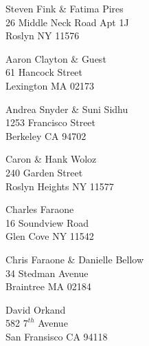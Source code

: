 \documentclass{article}
\begin{document}
\begin{center}
\begin{Huge}
\clearpage

\vspace*{\fill}
Steven Fink \& Fatima Pires\\
26 Middle Neck Road Apt 1J\\
Roslyn NY 11576\\
\vspace{\fill}

\clearpage

\vspace*{\fill}
Aaron Clayton \& Guest\\
61 Hancock Street\\
Lexington MA 02173\\
\vspace{\fill}

\clearpage

\vspace*{\fill}
Andrea Snyder \& Suni Sidhu\\
1253 Francisco Street\\
Berkeley CA 94702\\
\vspace{\fill}

\clearpage

\vspace*{\fill}
Caron \& Hank Woloz\\
240  Garden Street\\
Roslyn Heights NY 11577\\
\vspace{\fill}

\clearpage

\vspace*{\fill}
Charles Faraone\\
16 Soundview Road\\
Glen Cove NY 11542\\
\vspace{\fill}

\clearpage

\vspace*{\fill}
Chris Faraone \& Danielle Bellow\\
34 Stedman Avenue\\
Braintree MA 02184\\
\vspace{\fill}

\clearpage

\vspace*{\fill}
David Orkand\\
582 $7^{th}$ Avenue\\
San Fransisco CA 94118\\
\vspace{\fill}


\end{Huge}
\end{center}
\end{document}
